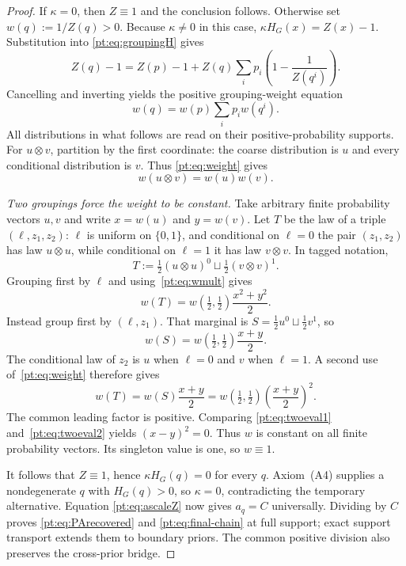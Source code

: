 \begin{proof}
If $\kappa=0$, then $Z\equiv1$ and the conclusion follows.  Otherwise set
$w(q):=1/Z(q)>0$.  Because $\kappa\ne0$ in this case,
$\kappa H_G(x)=Z(x)-1$.  Substitution into
\eqref{pt:eq:groupingH} gives
\[
 Z(q)-1=Z(p)-1+
 Z(q)\sum_i p_i\left(1-\frac1{Z(q^i)}\right).
\]
Cancelling and inverting yields the positive grouping-weight equation
\begin{equation}
 w(q)=w(p)\sum_i p_iw(q^i).
\tag{W}\label{pt:eq:weight}
\end{equation}
All distributions in what follows are read on their positive-probability
supports.  For $u\otimes v$, partition by the first coordinate: the coarse
distribution is $u$ and every conditional distribution is $v$.  Thus
\eqref{pt:eq:weight} gives
\begin{equation}
 w(u\otimes v)=w(u)w(v).
\tag{M}\label{pt:eq:wmult}
\end{equation}

\emph{Two groupings force the weight to be constant.}
Take arbitrary finite probability vectors $u,v$ and write
$x=w(u)$ and $y=w(v)$.  Let $T$ be the law of a triple
$(\ell,z_1,z_2)$: $\ell$ is uniform on $\{0,1\}$, and conditional on
$\ell=0$ the pair $(z_1,z_2)$ has law $u\otimes u$, while conditional on
$\ell=1$ it has law $v\otimes v$.  In tagged notation,
\[
 T:=\tfrac12(u\otimes u)^0\sqcup\tfrac12(v\otimes v)^1.
\]
Grouping first by $\ell$ and using~\eqref{pt:eq:wmult} gives
\begin{equation}
 w(T)=w(\tfrac12,\tfrac12)\frac{x^2+y^2}{2}.
\tag{E1}\label{pt:eq:twoeval1}
\end{equation}
Instead group first by $(\ell,z_1)$.  That marginal is
$S=\tfrac12u^0\sqcup\tfrac12v^1$, so
\[
 w(S)=w(\tfrac12,\tfrac12)\frac{x+y}{2}.
\]
The conditional law of $z_2$ is $u$ when $\ell=0$ and $v$ when $\ell=1$.
A second use of~\eqref{pt:eq:weight} therefore gives
\begin{equation}
 w(T)=w(S)\frac{x+y}{2}
 =w(\tfrac12,\tfrac12)\left(\frac{x+y}{2}\right)^2.
\tag{E2}\label{pt:eq:twoeval2}
\end{equation}
The common leading factor is positive.  Comparing
\eqref{pt:eq:twoeval1} and~\eqref{pt:eq:twoeval2} yields $(x-y)^2=0$.
Thus $w$ is constant on all finite probability vectors.  Its singleton value
is one, so $w\equiv1$.

It follows that $Z\equiv1$, hence $\kappa H_G(q)=0$ for every $q$.
Axiom~\textup{(A4)} supplies a nondegenerate $q$ with $H_G(q)>0$, so
$\kappa=0$, contradicting the temporary alternative.  Equation
\eqref{pt:eq:ascaleZ} now gives $a_q=C$ universally.
Dividing by $C$ proves \eqref{pt:eq:PArecovered} and
\eqref{pt:eq:final-chain} at full support; exact support transport extends
them to boundary priors.  The common positive division also preserves the
cross-prior bridge.
\end{proof}

